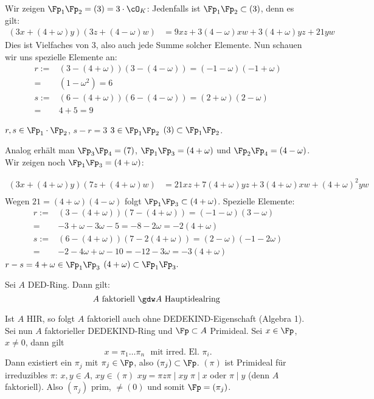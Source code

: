 \begin{Beispiel}
                  
 Wir zeigen $\Fp_1\Fp_2=(3)=3\cdot \cO_K$: Jedenfalls ist $\Fp_1\Fp_2\subset(3)$, denn es gilt:
 \begin{align*}
  (3x+(4+\omega)y)(3z+(4-\omega)w)&=9xz+3(4-\omega)xw+3(4+\omega)yz+21yw
 \end{align*}
Dies ist Vielfaches von $3$, also auch jede Summe solcher Elemente. Nun schauen wir uns spezielle Elemente an:
\begin{align*}
 r:=&(3-(4+\omega))(3-(4-\omega))=(-1-\omega)(-1+\omega)\\
 =&(1-\omega^2)=6\\
 s:=&(6-(4+\omega))(6-(4-\omega))=(2+\omega)(2-\omega)\\
  =&4+5=9
\end{align*}

$r,s\in\Fp_1\cdot\Fp_2$, $s-r=3$ \folge $3\in\Fp_1\Fp_2$ \folge $(3)\subset \Fp_1\Fp_2$.

Analog erhält man $\Fp_3\Fp_4=(7)$, $\Fp_1\Fp_3=(4+\omega)$ und $\Fp_2\Fp_4=(4-\omega)$. Wir zeigen noch $\Fp_1\Fp_3=(4+\omega)$:

\begin{align*}
 (3x+(4+\omega)y)(7z+(4+\omega)w)&= 21xz+7(4+\omega)yz+3(4+\omega)xw+(4+\omega)^2yw\\
\end{align*}
Wegen $21=(4+\omega)(4-\omega)$ folgt $\Fp_1\Fp_3\subset (4+\omega)$. Spezielle Elemente:
\begin{align*}
 r:=&(3-(4+\omega))(7-(4+\omega))=(-1-\omega)(3-\omega)\\
 =&-3+\omega-3\omega-5= -8-2\omega = -2(4+\omega)\\
 s:=&(6-(4+\omega))(7-2(4+\omega))=(2-\omega)(-1-2\omega)\\
 =& -2-4\omega + \omega -10 = -12-3\omega = -3(4+\omega)
\end{align*}
\folge $r-s=4+\omega\in \Fp_1\Fp_3$ \folge $(4+\omega)\subset \Fp_1\Fp_3.$
\end{Beispiel}

\begin{Fakt}
Sei $A$ DED-Ring. Dann gilt: \[ A\text{ faktoriell } \gdw A\text{ Hauptidealring }\] 
\end{Fakt}

\begin{Beweis}
 Ist $A$ HIR, so folgt $A$ faktoriell auch ohne DEDEKIND-Eigenschaft (Algebra 1).
 Sei nun $A$ faktorieller DEDEKIND-Ring und $\Fp\subset A$ Primideal. Sei $x\in\Fp$, $x\neq 0$, dann gilt
 \[ x=\pi_1\ldots\pi_n\,\,\mbox{ mit irred. El. }\pi_i.\]
 Dann existiert ein $\pi_j$ mit $\pi_j\in\Fp$, also $(\pi_j)\subset\Fp$.
 $(\pi)$ ist Primideal für irreduzibles $\pi$: $x,y\in A$, $xy\in(\pi)$ \folge $xy=\pi z$\folge $\pi\mid xy$ \folge $\pi\mid x$ oder $\pi\mid y$ (denn $A$ faktoriell).
 Also $(\pi_j)$ prim, $\neq (0)$ und  somit $\Fp=(\pi_j)$.
\end{Beweis}

